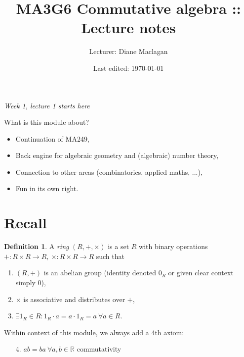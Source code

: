 \documentclass[a4paper]{article}
\title{MA3G6 Commutative algebra :: Lecture notes}
\author{Lecturer: Diane Maclagan}
\date{Last edited: \today}
\theoremstyle{definition}
\newtheorem{defn}{Definition}[subsection]
\begin{document}
\maketitle
\thispagestyle{empty}

\tableofcontents
\thispagestyle{empty}
\newpage
\setcounter{page}{1}

\begin{flushright}
\textit{Week 1, lecture 1 starts here}
\end{flushright}

What is this module about?
\begin{itemize}
\item Continuation of MA249,
\item Back engine for algebraic geometry and (algebraic) number theory,
\item Connection to other areas (combinatorics, applied maths, ...),
\item Fun in its own right.
\end{itemize}

\section*{Recall}
\begin{defn}
A \textit{ring} $(R,+,\times)$ is a set $R$ with binary operations $+:R\times R\rightarrow R,\ \times:R\times R\rightarrow R$ such that
\begin{enumerate}
\item $(R,+)$ is an abelian group (identity denoted $0_R$ or given clear context simply 0),
\item $\times$ is associative and distributes over $+$,
\item $\exists 1_R\in R:1_R\cdot a = a\cdot 1_R=a\ \forall a \in R$.
\end{enumerate}
\end{defn}
Within context of this module, we always add a 4th axiom:
\begin{enumerate}
\item[4.] $ab=ba \ \forall a,b\in \mathbb R$ \qquad commutativity
\end{enumerate}
\end{document}
